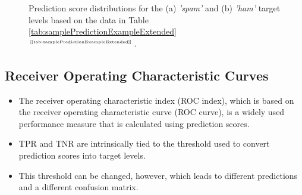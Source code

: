\documentclass[xcolor={table}]{beamer}
\newcommand{\featL}[1]{\textit{'#1'}}
\newcommand{\ourRef}[1]{\ref{#1} $^{\text{\tiny[\pageref{#1}]}}$}
\begin{document}
 \begin{frame} 
\begin{figure}[htb]
       \begin{centering}
       \caption{Prediction score distributions for the (a) \featL{spam} and (b) \featL{ham} target levels based on the data in Table \ourRef{tab:samplePredictionExampleExtended}.}
       \label{fig:scoreExampleHistos}
       \end{centering}
\end{figure}
\end{frame} 

\subsection{Receiver Operating Characteristic Curves}

\begin{frame}
	\begin{itemize}
		\item The \alert{receiver operating characteristic index} (\alert{ROC index}), which is based on the \alert{receiver operating characteristic curve} (\alert{ROC curve}), is a widely used performance measure that is calculated using prediction scores. 
		\item TPR and TNR are intrinsically tied to the threshold used to convert prediction scores into target levels. 
		\item This threshold can be changed, however, which leads to different predictions and a different confusion matrix. 
	\end{itemize}
\end{frame}
\end{document}
